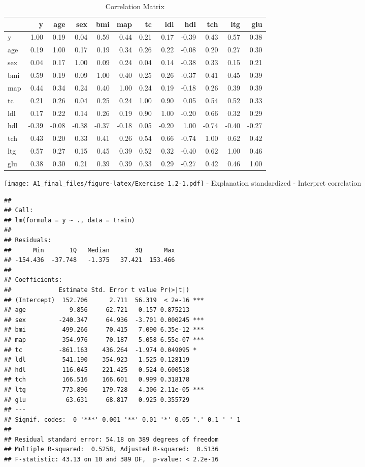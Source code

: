 \documentclass[
]{article}
\begin{document}
\begin{table}

\caption{\label{tab:Exercise 1.2}Correlation Matrix}
\centering
\begin{tabular}[t]{l|r|r|r|r|r|r|r|r|r|r|r}
\hline
  & y & age & sex & bmi & map & tc & ldl & hdl & tch & ltg & glu\\
\hline
y & 1.00 & 0.19 & 0.04 & 0.59 & 0.44 & 0.21 & 0.17 & -0.39 & 0.43 & 0.57 & 0.38\\
\hline
age & 0.19 & 1.00 & 0.17 & 0.19 & 0.34 & 0.26 & 0.22 & -0.08 & 0.20 & 0.27 & 0.30\\
\hline
sex & 0.04 & 0.17 & 1.00 & 0.09 & 0.24 & 0.04 & 0.14 & -0.38 & 0.33 & 0.15 & 0.21\\
\hline
bmi & 0.59 & 0.19 & 0.09 & 1.00 & 0.40 & 0.25 & 0.26 & -0.37 & 0.41 & 0.45 & 0.39\\
\hline
map & 0.44 & 0.34 & 0.24 & 0.40 & 1.00 & 0.24 & 0.19 & -0.18 & 0.26 & 0.39 & 0.39\\
\hline
tc & 0.21 & 0.26 & 0.04 & 0.25 & 0.24 & 1.00 & 0.90 & 0.05 & 0.54 & 0.52 & 0.33\\
\hline
ldl & 0.17 & 0.22 & 0.14 & 0.26 & 0.19 & 0.90 & 1.00 & -0.20 & 0.66 & 0.32 & 0.29\\
\hline
hdl & -0.39 & -0.08 & -0.38 & -0.37 & -0.18 & 0.05 & -0.20 & 1.00 & -0.74 & -0.40 & -0.27\\
\hline
tch & 0.43 & 0.20 & 0.33 & 0.41 & 0.26 & 0.54 & 0.66 & -0.74 & 1.00 & 0.62 & 0.42\\
\hline
ltg & 0.57 & 0.27 & 0.15 & 0.45 & 0.39 & 0.52 & 0.32 & -0.40 & 0.62 & 1.00 & 0.46\\
\hline
glu & 0.38 & 0.30 & 0.21 & 0.39 & 0.39 & 0.33 & 0.29 & -0.27 & 0.42 & 0.46 & 1.00\\
\hline
\end{tabular}
\end{table}

\texttt{[image: A1\_final\_files/figure-latex/Exercise 1.2-1.pdf]} -
Explanation standardized - Interpret correlation

\begin{verbatim}
## 
## Call:
## lm(formula = y ~ ., data = train)
## 
## Residuals:
##      Min       1Q   Median       3Q      Max 
## -154.436  -37.748   -1.375   37.421  153.466 
## 
## Coefficients:
##             Estimate Std. Error t value Pr(>|t|)    
## (Intercept)  152.706      2.711  56.319  < 2e-16 ***
## age            9.856     62.721   0.157 0.875213    
## sex         -240.347     64.936  -3.701 0.000245 ***
## bmi          499.266     70.415   7.090 6.35e-12 ***
## map          354.976     70.187   5.058 6.55e-07 ***
## tc          -861.163    436.264  -1.974 0.049095 *  
## ldl          541.190    354.923   1.525 0.128119    
## hdl          116.045    221.425   0.524 0.600518    
## tch          166.516    166.601   0.999 0.318178    
## ltg          773.896    179.728   4.306 2.11e-05 ***
## glu           63.631     68.817   0.925 0.355729    
## ---
## Signif. codes:  0 '***' 0.001 '**' 0.01 '*' 0.05 '.' 0.1 ' ' 1
## 
## Residual standard error: 54.18 on 389 degrees of freedom
## Multiple R-squared:  0.5258, Adjusted R-squared:  0.5136 
## F-statistic: 43.13 on 10 and 389 DF,  p-value: < 2.2e-16
\end{verbatim}
\end{document}
